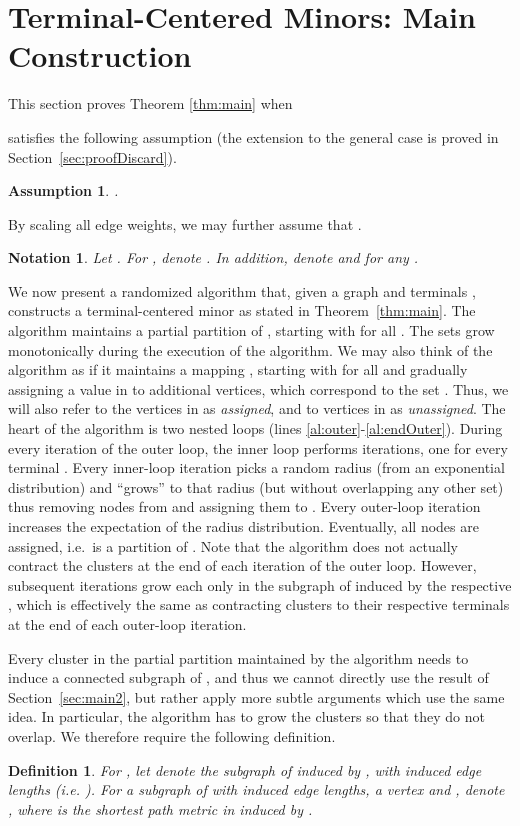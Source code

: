 \documentclass[twoside,leqno,twocolumn]{article}
\newtheorem{definition}[Definition]{Definition}
\newtheorem{assumption}[Definition]{Assumption}
\newtheorem{notation}[Definition]{Notation}
\newtheorem{definition}[theorem]{Definition}
\newtheorem{assumption}[theorem]{Assumption}
\newtheorem{notation}[theorem]{Notation}
\begin{document}
\section{Terminal-Centered Minors: Main Construction} \label{sec:TCM}

This section proves Theorem \ref{thm:main} when 

satisfies the following assumption 
(the extension to the general case is proved in Section~\ref{sec:proofDiscard}).
\begin{assumption} \label{a:polyLogDelta}
.
\end{assumption}
By scaling all edge weights, we may further assume that 
.

\begin{notation}
Let .
For , denote . 
In addition, denote  
and  for any . 
\end{notation}

We now present a randomized algorithm that, 
given a graph  and terminals ,
constructs a terminal-centered minor  as stated in Theorem~\ref{thm:main}.
The algorithm maintains a partial partition  of , 
starting with  for all . 
The sets grow monotonically during the execution of the algorithm. 
We may also think of the algorithm as if it maintains a mapping 
, 
starting with  for all  and gradually assigning a value in  
to additional vertices, which correspond to the set . 
Thus, we will also refer to the vertices in  as {\em assigned}, 
and to vertices in  as {\em unassigned}.
The heart of the algorithm is two nested loops (lines \ref{al:outer}-\ref{al:endOuter}). During every iteration of the outer loop, the inner loop performs  iterations, one for every terminal . 
Every inner-loop iteration picks a random radius (from an exponential distribution) 
and ``grows''  to that radius (but without overlapping any other set) thus removing nodes from  and assigning them to . 
Every outer-loop iteration increases the expectation of the radius distribution.
Eventually, all nodes are assigned, 
i.e.\  is a partition of .
Note that the algorithm does not actually contract the clusters at the end of each iteration of the outer loop. 
However, subsequent iterations grow each  
only in the subgraph of  induced by the respective ,
which is effectively the same as contracting clusters to their respective terminals at the end of each outer-loop iteration.

Every cluster in the partial partition maintained by the algorithm needs to induce a connected subgraph of , 
and thus we cannot directly use the result of Section~\ref{sec:main2}, 
but rather apply more subtle arguments which use the same idea. 
In particular, the algorithm has to grow the clusters so that they do not overlap. We therefore require the following definition.
\begin{definition}
For , let  denote the subgraph of  induced by , with induced edge lengths (i.e. ).
For a subgraph  of  with induced edge lengths, a vertex  and , denote , where  is the shortest path metric in  induced by .
\end{definition}
\end{document}
